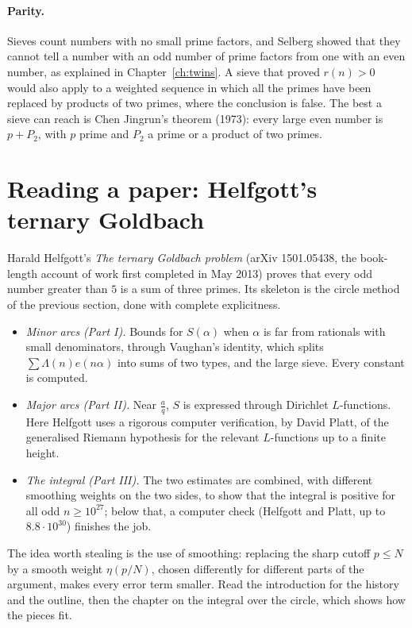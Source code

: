 \paragraph{Parity.} Sieves count numbers with no small prime factors, and Selberg showed that they cannot tell a number with an odd number of prime
factors from one with an even number, as explained in Chapter~\ref{ch:twins}. A sieve that proved $r(n)>0$ would also apply to a weighted sequence
in which all the primes have been replaced by products of two primes, where the conclusion is false. The best a sieve can reach is Chen Jingrun's
theorem (1973): every large even number is $p+P_2$, with $p$ prime and $P_2$ a prime or a product of two primes.

\section{Reading a paper: Helfgott's ternary Goldbach}

Harald Helfgott's \emph{The ternary Goldbach problem} (arXiv 1501.05438, the book-length account of work first completed in May 2013) proves that every
odd number greater than $5$ is a sum of three primes. Its skeleton is the circle method of the previous section, done with complete explicitness.
\begin{itemize}
\item \emph{Minor arcs (Part I).} Bounds for $S(\alpha)$ when $\alpha$ is far from rationals with small denominators, through Vaughan's identity, which
splits $\sum\Lambda(n)e(n\alpha)$ into sums of two types, and the large sieve. Every constant is computed.
\item \emph{Major arcs (Part II).} Near $\frac aq$, $S$ is expressed through Dirichlet $L$-functions. Here Helfgott uses a rigorous computer verification,
by David Platt, of the generalised Riemann hypothesis for the relevant $L$-functions up to a finite height.
\item \emph{The integral (Part III).} The two estimates are combined, with different smoothing weights on the two sides, to show that the integral is
positive for all odd $n\ge10^{27}$; below that, a computer check (Helfgott and Platt, up to $8.8\cdot10^{30}$) finishes the job.
\end{itemize}
The idea worth stealing is the use of smoothing: replacing the sharp cutoff $p\le N$ by a smooth weight $\eta(p/N)$, chosen differently for different
parts of the argument, makes every error term smaller. Read the introduction for the history and the outline, then the chapter on the integral over the
circle, which shows how the pieces fit.

